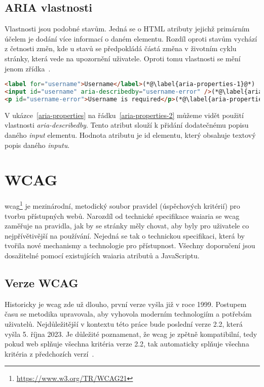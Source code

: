 \subsection{ARIA vlastnosti}

Vlastnosti jsou podobné stavům.
Jedná se o HTML atributy jejichž primárním účelem je dodání více informací o daném elementu.
Rozdíl oproti stavům vychází z četnosti změn, kde u stavů se předpokládá částá změna v životním cyklu stránky, která vede na upozornění uživatele.
Oproti tomu vlastnosti se mění jenom zřídka~\cite[sekce 6.1]{wai-aria}.

\begin{lstlisting}[caption={Aria vlastnosti}, label={aria-properties}, language=html]
<label for="username">Username</label>(*@\label{aria-properties-1}@*)
<input id="username" aria-describedby="username-error" />(*@\label{aria-properties-2}@*)
<p id="username-error">Username is required</p>(*@\label{aria-properties-3}@*)
\end{lstlisting}

V ukázce~\ref{aria-properties} na řádku~\ref{aria-properties-2} můžeme vidět použití vlastnosti \textit{aria-describedby}.
Tento atribut slouží k přidání dodatečnému popisu daného \textit{input} elementu. Hodnota atributu je id elementu, který obsahuje textový popis daného \textit{inputu}.

\section{WCAG}

\gls{wcag}\footnote{\url{https://www.w3.org/TR/WCAG21}} je mezinárodní, metodický soubor pravidel (úspěchových kritérií) pro tvorbu přístupných webů.
Narozdíl od technické specifikace \gls{waiaria} se \gls{wcag} zaměřuje na pravidla, jak by se stránky měly chovat, aby byly pro uživatele co nejpřívětivější na používání.
Nejedná se tak o technickou specifikaci, která by tvořila nové mechanismy a technologie pro přístupnost.
Všechny doporučení jsou dosažitelné pomocí existujících \gls{waiaria} atributů a JavaScriptu.

\subsection{Verze WCAG}

Historicky je \gls{wcag} zde už dlouho, první verze vyšla již v roce 1999.
Postupem času se metodika upravovala, aby vyhovola moderním technologiím a potřebám uživatelů.
Nejdůležitější v kontextu této práce bude poslední verze 2.2, která vyšla 5. října 2023.
Je důležité poznamenat, že \gls{wcag} je zpětně kompatibilní, tedy pokud web splňuje všechna kritéria verze 2.2, tak automaticky splňuje všechna kritéria z předchozích verzí~\cite{wcag}.

